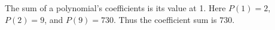 The sum of a polynomial's coefficients is its value at 1. Here $P(1)=2$, $P(2)=9$, and $P(9)=730$. Thus the coefficient sum is $\boxed{730}$.
